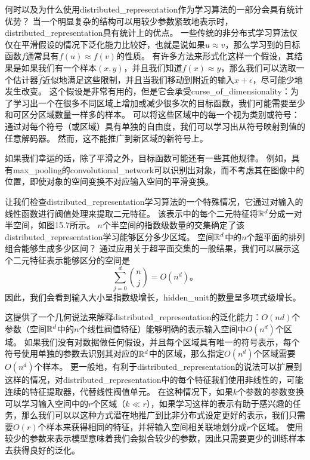 何时以及为什么使用\gls{distributed_representation}作为学习算法的一部分会具有统计优势？
当一个明显复杂的结构可以用较少参数紧致地表示时，\gls{distributed_representation}具有统计上的优点。
一些传统的非分布式学习算法仅仅在平滑假设的情况下泛化能力比较好，也就是说如果$u\approx v$，那么学习到的目标函数$f$通常具有$f(u) \approx f(v)$的性质。
有许多方法来形式化这样一个假设，其结果是如果我们有一个样本$(x,y)$，并且我们知道$f(x) \approx y$，那么我们可以选取一个估计器$\hat{f}$近似地满足这些限制，并且当我们移动到附近的输入$x + \epsilon$，尽可能少地发生改变。
这个假设是非常有用的，但是它会承受\gls{curse_of_dimensionality}：为了学习出一个在很多不同区域上增加或减少很多次的目标函数，我们可能需要至少和可区分区域数量一样多的样本。
可以将这些区域中的每一个视为类别或符号：通过对每个符号（或区域）具有单独的自由度，我们可以学习出从符号映射到值的任意解码器。
然而，这不能推广到新区域的新符号上。


如果我们幸运的话，除了平滑之外，目标函数可能还有一些其他规律。
例如，具有\gls{max_pooling}的\gls{convolutional_network}可以识别出对象，而不考虑其在图像中的位置，即使对象的空间变换不对应输入空间的平滑变换。


让我们检查\gls{distributed_representation}学习算法的一个特殊情况，它通过对输入的线性函数进行阀值处理来提取二元特征。
该表示中的每个二元特征将$\mathbb{R}^d$分成一对半空间，如图15.7所示。
$n$个半空间的指数级数量的交集确定了该\gls{distributed_representation}学习能够区分多少区域。
空间$\mathbb{R}^d$中的$n$个超平面的排列组合能够生成多少区间？
通过应用关于超平面交集的一般结果\citep{Zaslavsky-1975}，我们可以展示\citep{Pascanu+et+al-ICLR2014b}这个二元特征表示能够区分的空间是
\begin{equation}
	\sum_{j=0}^d \binom{n}{j} = O(n^d)。
\end{equation}
因此，我们会看到输入大小呈指数级增长，\gls{hidden_unit}的数量呈多项式级增长。


这提供了一个几何说法来解释\gls{distributed_representation}的泛化能力：$O(nd)$个参数（空间$\mathbb{R}^d$中的$n$个线性阀值特征）能够明确的表示输入空间中$O(n^d)$个区域。
如果我们没有对数据做任何假设，并且每个区域具有唯一的符号表示，每个符号使用单独的参数去识别其对应的$\mathbb{R}^d$中的区域，那么指定$O(n^d)$个区域需要$O(n^d)$个样本。
更一般地，有利于\gls{distributed_representation}的说法可以扩展到这样的情况，对\gls{distributed_representation}中的每个特征我们使用非线性的，可能连续的特征提取器，代替线性阀值单元。
在这种情况下，如果$k$个参数的参数变换可以学习输入空间中的$r$个区域（$k\ll r$），如果学习这样的表示有助于感兴趣的任务，那么我们可以以这种方式潜在地推广到比非分布式设定更好的表示，我们只需要$O(r)$个样本来获得相同的特征，并将输入空间相关联地划分成$r$个区域。
使用较少的参数来表示模型意味着我们会拟合较少的参数，因此只需要更少的训练样本去获得良好的泛化。


